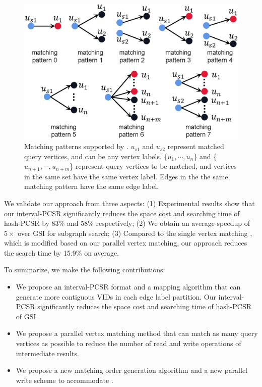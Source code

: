 \begin{figure}
\centering
\includegraphics[width=0.9\columnwidth]{./figure/extpattern.eps}
\caption{Matching patterns supported by \SystemName. $u_{s1}$ and $u_{s2}$ represent matched query vertices, and can be any vertex labels. \{$u_1, \cdots, u_{n}$\} and 
\{$u_{n+1}, \cdots, u_{n+m}$\} represent query vertices to be matched, and vertices in the same set have the same vertex label. Edges in the the same matching pattern have the same edge label.}
\label{fig:matchpattern}
\end{figure}

 We validate our approach from three aspects: (1) Experimental results show that our interval-PCSR significantly reduces the space cost and searching time of hash-PCSR by 83\% and 58\% respectively; (2) We obtain an average speedup of $5\times$ over GSI for subgraph search; (3) Compared to the single vertex matching , which is modified based on our parallel vertex matching, our approach reduces the search time by 15.9\% on average.

 To summarize, we make the following contributions:
 \begin{itemize}
  \item We propose an interval-PCSR format and a mapping algorithm that can generate more contiguous VIDs in each edge label partition. Our interval-PCSR significantly reduces the space cost and searching time of hash-PCSR of GSI.
  \item We propose a parallel vertex matching method that can match as many query vertices as possible to reduce the number of read and write operations of intermediate results.
  \item We propose a new matching order generation algorithm and a new parallel write scheme to accommodate \SystemName.
\end{itemize}
